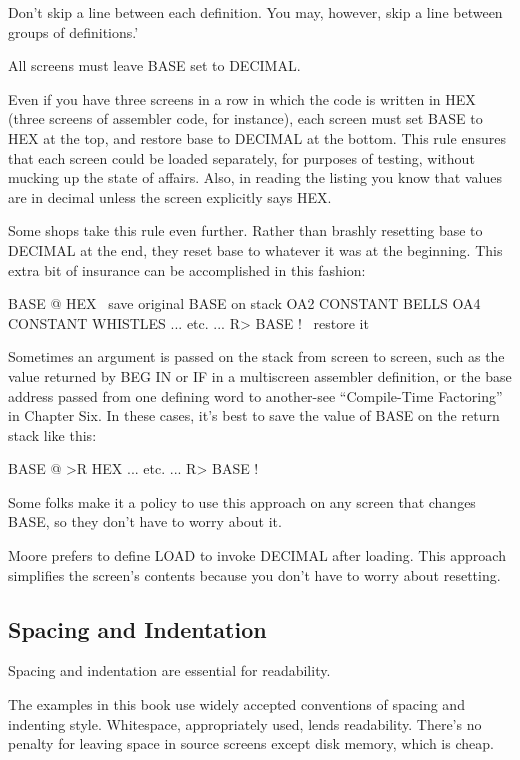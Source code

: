 Don't skip a line between each definition.  You may, however, skip a
line between groups of definitions.'
\begin{tip}
All screens must leave BASE set to DECIMAL.
\end{tip}
Even if you have three screens in a row in which the code is written in
HEX (three screens of assembler code, for instance), each screen must set
BASE to HEX at the top, and restore base to DECIMAL at the bottom.
This rule ensures that each screen could be loaded separately, for purposes
of testing, without mucking up the state of affairs.  Also, in reading
the listing you know that values are in decimal unless the screen explicitly
says HEX.

Some shops take this rule even further.  Rather than brashly resetting
base to DECIMAL at the end, they reset base to whatever it was
at the beginning.  This extra bit of insurance can be accomplished in this
fashion:
\begin{Code}
BASE @          HEX     \ save original BASE on stack
OA2 CONSTANT BELLS
OA4 CONSTANT WHISTLES
... etc. ...
R> BASE !               \ restore it
\end{Code}

Sometimes an argument is passed on the stack from screen to screen,
such as the value returned by BEG IN or IF in a multiscreen assembler
definition, or the base address passed from one defining word to
another-see ``Compile-Time Factoring'' in Chapter Six.  In these cases,
it's best to save the value of BASE on the return stack like this:
\begin{Code}
BASE @ >R HEX
... etc. ...
R> BASE !
\end{Code}

Some folks make it a policy to use this approach on any screen that
changes BASE, so they don't have to worry about it.

Moore prefers to define LOAD to invoke DECIMAL after loading.
This approach simplifies the screen's contents because you don't have to
worry about resetting.

\subsection{Spacing and Indentation}

\begin{tip}
Spacing and indentation are essential for readability.
\end{tip}
The examples in this book use widely accepted conventions of spacing
and indenting style.  Whitespace, appropriately used, lends readability.
There's no penalty for leaving space in source screens except disk
memory, which is cheap.

